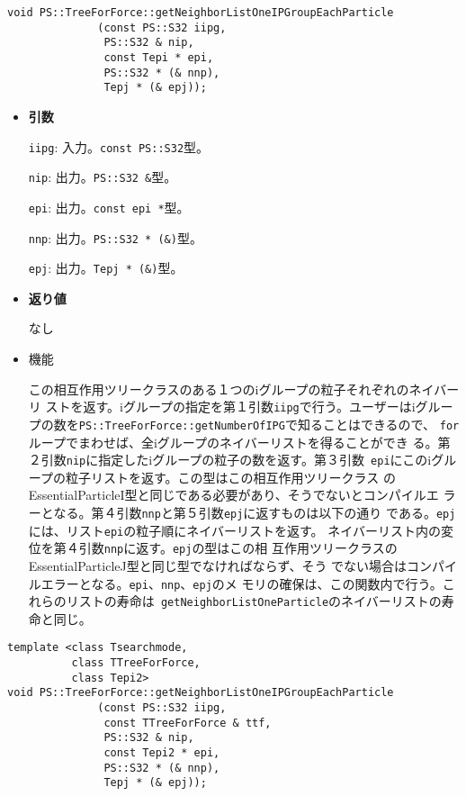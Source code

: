 \begin{screen}
\begin{verbatim}
void PS::TreeForForce::getNeighborListOneIPGroupEachParticle
              (const PS::S32 iipg,
               PS::S32 & nip,
               const Tepi * epi,
               PS::S32 * (& nnp),
               Tepj * (& epj));
\end{verbatim}
\end{screen}

\begin{itemize}

\item{{\bf 引数}}

{\tt iipg}: 入力。{\tt const PS::S32}型。

{\tt nip}: 出力。{\tt PS::S32 \&}型。

{\tt epi}: 出力。{\tt const epi *}型。

{\tt nnp}: 出力。{\tt PS::S32 * (\&)}型。

{\tt epj}: 出力。{\tt Tepj * (\&)}型。

\item{{\bf 返り値}}

なし

\item 機能

この相互作用ツリークラスのある１つのiグループの粒子それぞれのネイバーリ
ストを返す。iグループの指定を第１引数{\tt iipg}で行う。ユーザーはiグルー
プの数を{\tt PS::TreeForForce::getNumberOfIPG}で知ることはできるので、
{\tt for}ループでまわせば、全iグループのネイバーリストを得ることができ
る。第２引数{\tt nip}に指定したiグループの粒子の数を返す。第３引数{\tt
epi}にこのiグループの粒子リストを返す。この型はこの相互作用ツリークラス
のEssentialParticleI型と同じである必要があり、そうでないとコンパイルエ
ラーとなる。第４引数{\tt nnp}と第５引数{\tt epj}に返すものは以下の通り
である。{\tt epj}には、リスト{\tt epi}の粒子順にネイバーリストを返す。
ネイバーリスト内の変位を第４引数{\tt nnp}に返す。{\tt epj}の型はこの相
互作用ツリークラスのEssentialParticleJ型と同じ型でなければならず、そう
でない場合はコンパイルエラーとなる。{\tt epi}、{\tt nnp}、{\tt epj}のメ
モリの確保は、この関数内で行う。これらのリストの寿命は{\tt
getNeighborListOneParticle}のネイバーリストの寿命と同じ。

\end{itemize}

\begin{screen}
\begin{verbatim}
template <class Tsearchmode,
          class TTreeForForce,
          class Tepi2>
void PS::TreeForForce::getNeighborListOneIPGroupEachParticle
              (const PS::S32 iipg,
               const TTreeForForce & ttf,
               PS::S32 & nip,
               const Tepi2 * epi,
               PS::S32 * (& nnp),
               Tepj * (& epj));
\end{verbatim}
\end{screen}

